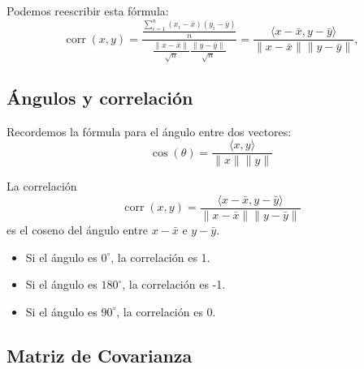 \documentclass[a4paper]{article}
\DeclareMathOperator{\corr}{corr}
\begin{document}
Podemos reescribir esta fórmula:
$$
\corr(x,y) = \frac{\frac{\sum_{i = 1}^n (x_i - \bar x)(y_i - \bar y)}{n}}{\frac{\|x  - \bar x\|}{\sqrt{n}}\frac{\|y - \bar y\|}{\sqrt{n}}} = \frac{\langle x - \bar x, y - \bar y\rangle}{\|x - \bar x\|\|y  - \bar y\|},
$$

\subsection{\'Angulos y correlaci\'on}

\begin{minipage}{.45\textwidth}
Recordemos la fórmula para el ángulo entre dos vectores:
$$
\cos(\theta) = \frac{\langle x, y \rangle}{\|x\|\|y\|}
$$
\end{minipage} \hspace{.4cm} %
\begin{minipage}{.45\textwidth}
\end{minipage}

La correlación
$$\corr(x, y) = \frac{\langle x - \bar x, y - \bar y \rangle}{\|x - \bar x\|\|y - \bar y\|}$$
 es el coseno del ángulo entre $x - \bar x$ e $y - \bar y$.

\begin{itemize}
\item Si el ángulo es $0^\circ$, la correlación es 1.
\item Si el ángulo es $180^\circ$, la correlación es -1.
\item Si el ángulo es $90^\circ$, la correlación es 0.
\end{itemize}

\subsection{Matriz de Covarianza}
\end{document}
